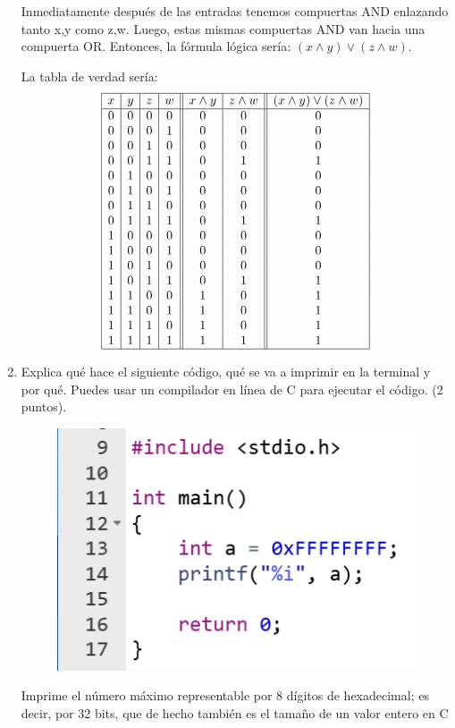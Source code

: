 \documentclass[12pt,letterpaper]{article}
\begin{document}
\begin{enumerate}
    Inmediatamente después de las entradas tenemos compuertas AND enlazando tanto x,y como z,w. Luego, estas mismas compuertas AND van hacia una compuerta OR.
    Entonces, la fórmula lógica sería: $(x\land y)\lor(z\land w)$.

    La tabla de verdad sería:
    \[
    \begin{array}{|c|c|c|c||c|c||c|}
      \hline
      x & y & z & w & x \land y & z \land w & (x \land y) \lor (z \land w) \\
      \hline
      0 & 0 & 0 & 0 & 0 & 0 & 0 \\
      0 & 0 & 0 & 1 & 0 & 0 & 0 \\
      0 & 0 & 1 & 0 & 0 & 0 & 0 \\
      0 & 0 & 1 & 1 & 0 & 1 & 1 \\
      0 & 1 & 0 & 0 & 0 & 0 & 0 \\
      0 & 1 & 0 & 1 & 0 & 0 & 0 \\
      0 & 1 & 1 & 0 & 0 & 0 & 0 \\
      0 & 1 & 1 & 1 & 0 & 1 & 1 \\
      1 & 0 & 0 & 0 & 0 & 0 & 0 \\
      1 & 0 & 0 & 1 & 0 & 0 & 0 \\
      1 & 0 & 1 & 0 & 0 & 0 & 0 \\
      1 & 0 & 1 & 1 & 0 & 1 & 1 \\
      1 & 1 & 0 & 0 & 1 & 0 & 1 \\
      1 & 1 & 0 & 1 & 1 & 0 & 1 \\
      1 & 1 & 1 & 0 & 1 & 0 & 1 \\
      1 & 1 & 1 & 1 & 1 & 1 & 1 \\
      \hline
    \end{array}
    \]

    \item Explica qué hace el siguiente código, qué se va a imprimir en la terminal y por qué. Puedes usar un compilador en línea de C para ejecutar el código. (2 puntos).
    \begin{figure}[H]
        \centering
        \includegraphics[width=0.5\linewidth]{image.png}
    \end{figure}
    Imprime el número máximo representable por 8 dígitos de hexadecimal; es decir, por 32 bits, que de hecho también es el tamaño de un valor entero en C


\end{enumerate}
\end{document}
